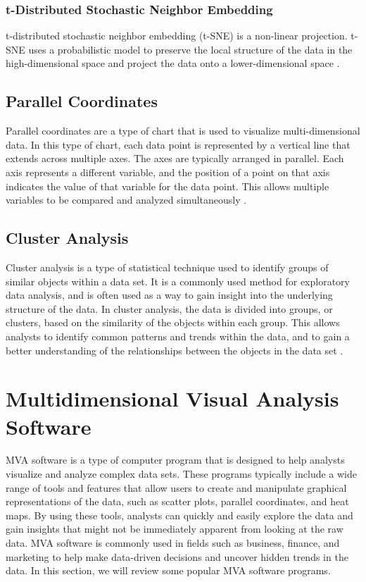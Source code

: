\subsubsection{t-Distributed Stochastic Neighbor Embedding}

t-distributed stochastic neighbor embedding (t-SNE) is a non-linear projection. t-SNE uses a probabilistic model to preserve the local structure of the data in the high-dimensional space and project the data onto a lower-dimensional space \parencite{van2008visualizing}.


\subsection{Parallel Coordinates}

Parallel coordinates are a type of chart that is used to visualize multi-dimensional data. In this type of chart, each data point is represented by a vertical line that extends across multiple axes. The axes are typically arranged in parallel. Each axis represents a different variable, and the position of a point on that axis indicates the value of that variable for the data point. This allows multiple variables to be compared and analyzed simultaneously \parencite{inselberg1990parallel}.

\subsection{Cluster Analysis}

Cluster analysis is a type of statistical technique used to identify groups of similar objects within a data set. It is a commonly used method for exploratory data analysis, and is often used as a way to gain insight into the underlying structure of the data. In cluster analysis, the data is divided into groups, or clusters, based on the similarity of the objects within each group. This allows analysts to identify common patterns and trends within the data, and to gain a better understanding of the relationships between the objects in the data set \parencite{duran2013cluster}.



\section{Multidimensional Visual Analysis Software}

MVA software is a type of computer program that is designed to help analysts visualize and analyze complex data sets. These programs typically include a wide range of tools and features that allow users to create and manipulate graphical representations of the data, such as scatter plots, parallel coordinates, and heat maps. By using these tools, analysts can quickly and easily explore the data and gain insights that might not be immediately apparent from looking at the raw data. MVA software is commonly used in fields such as business, finance, and marketing to help make data-driven decisions and uncover hidden trends in the data. In this section, we will review some popular MVA software programs.



